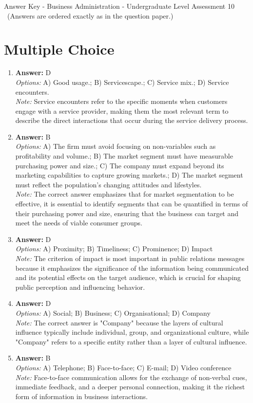\documentclass[12pt]{article}
\begin{document}
\begin{center}
Answer Key - Business Administration - Undergraduate Level Assessment 10 \
\small (Answers are ordered exactly as in the question paper.)
\end{center}

\section*{Multiple Choice}
\begin{enumerate}[label=\arabic*.]
\item \textbf{Answer:} D
\\ \textit{Options:} A) Good usage.; B) Servicescape.; C) Service mix.; D) Service encounters.
\\ \textit{Note:} Service encounters refer to the specific moments when customers engage with a service provider, making them the most relevant term to describe the direct interactions that occur during the service delivery process.
\item \textbf{Answer:} B
\\ \textit{Options:} A) The firm must avoid focusing on non-variables such as profitability and volume.; B) The market segment must have measurable purchasing power and size.; C) The company must expand beyond its marketing capabilities to capture growing markets.; D) The market segment must reflect the population's changing attitudes and lifestyles.
\\ \textit{Note:} The correct answer emphasizes that for market segmentation to be effective, it is essential to identify segments that can be quantified in terms of their purchasing power and size, ensuring that the business can target and meet the needs of viable consumer groups.
\item \textbf{Answer:} D
\\ \textit{Options:} A) Proximity; B) Timeliness; C) Prominence; D) Impact
\\ \textit{Note:} The criterion of impact is most important in public relations messages because it emphasizes the significance of the information being communicated and its potential effects on the target audience, which is crucial for shaping public perception and influencing behavior.
\item \textbf{Answer:} D
\\ \textit{Options:} A) Social; B) Business; C) Organisational; D) Company
\\ \textit{Note:} The correct answer is "Company" because the layers of cultural influence typically include individual, group, and organizational culture, while "Company" refers to a specific entity rather than a layer of cultural influence.
\item \textbf{Answer:} B
\\ \textit{Options:} A) Telephone; B) Face-to-face; C) E-mail; D) Video conference
\\ \textit{Note:} Face-to-face communication allows for the exchange of non-verbal cues, immediate feedback, and a deeper personal connection, making it the richest form of information in business interactions.
\end{enumerate}
\end{document}
